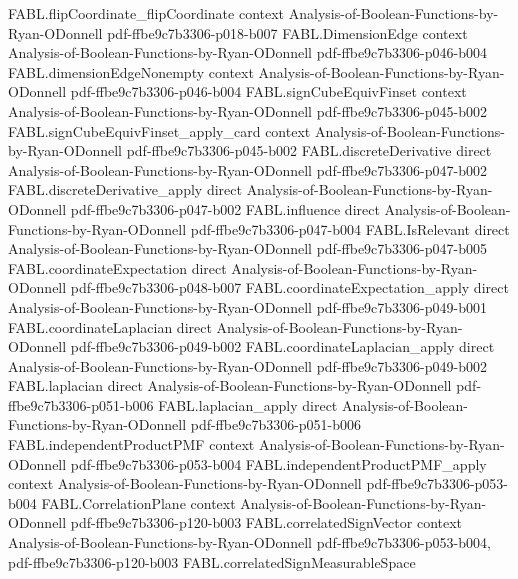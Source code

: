 \begin{theorem}
\proofstep
  {FABL.flipCoordinate_flipCoordinate}
  {context}
  {Analysis-of-Boolean-Functions-by-Ryan-ODonnell}
  {pdf-ffbe9c7b3306-p018-b007}
\proofstep
  {FABL.DimensionEdge}
  {context}
  {Analysis-of-Boolean-Functions-by-Ryan-ODonnell}
  {pdf-ffbe9c7b3306-p046-b004}
\proofstep
  {FABL.dimensionEdgeNonempty}
  {context}
  {Analysis-of-Boolean-Functions-by-Ryan-ODonnell}
  {pdf-ffbe9c7b3306-p046-b004}
\proofstep
  {FABL.signCubeEquivFinset}
  {context}
  {Analysis-of-Boolean-Functions-by-Ryan-ODonnell}
  {pdf-ffbe9c7b3306-p045-b002}
\proofstep
  {FABL.signCubeEquivFinset_apply_card}
  {context}
  {Analysis-of-Boolean-Functions-by-Ryan-ODonnell}
  {pdf-ffbe9c7b3306-p045-b002}
\proofstep
  {FABL.discreteDerivative}
  {direct}
  {Analysis-of-Boolean-Functions-by-Ryan-ODonnell}
  {pdf-ffbe9c7b3306-p047-b002}
\proofstep
  {FABL.discreteDerivative_apply}
  {direct}
  {Analysis-of-Boolean-Functions-by-Ryan-ODonnell}
  {pdf-ffbe9c7b3306-p047-b002}
\proofstep
  {FABL.influence}
  {direct}
  {Analysis-of-Boolean-Functions-by-Ryan-ODonnell}
  {pdf-ffbe9c7b3306-p047-b004}
\proofstep
  {FABL.IsRelevant}
  {direct}
  {Analysis-of-Boolean-Functions-by-Ryan-ODonnell}
  {pdf-ffbe9c7b3306-p047-b005}
\proofstep
  {FABL.coordinateExpectation}
  {direct}
  {Analysis-of-Boolean-Functions-by-Ryan-ODonnell}
  {pdf-ffbe9c7b3306-p048-b007}
\proofstep
  {FABL.coordinateExpectation_apply}
  {direct}
  {Analysis-of-Boolean-Functions-by-Ryan-ODonnell}
  {pdf-ffbe9c7b3306-p049-b001}
\proofstep
  {FABL.coordinateLaplacian}
  {direct}
  {Analysis-of-Boolean-Functions-by-Ryan-ODonnell}
  {pdf-ffbe9c7b3306-p049-b002}
\proofstep
  {FABL.coordinateLaplacian_apply}
  {direct}
  {Analysis-of-Boolean-Functions-by-Ryan-ODonnell}
  {pdf-ffbe9c7b3306-p049-b002}
\proofstep
  {FABL.laplacian}
  {direct}
  {Analysis-of-Boolean-Functions-by-Ryan-ODonnell}
  {pdf-ffbe9c7b3306-p051-b006}
\proofstep
  {FABL.laplacian_apply}
  {direct}
  {Analysis-of-Boolean-Functions-by-Ryan-ODonnell}
  {pdf-ffbe9c7b3306-p051-b006}
\proofstep
  {FABL.independentProductPMF}
  {context}
  {Analysis-of-Boolean-Functions-by-Ryan-ODonnell}
  {pdf-ffbe9c7b3306-p053-b004}
\proofstep
  {FABL.independentProductPMF_apply}
  {context}
  {Analysis-of-Boolean-Functions-by-Ryan-ODonnell}
  {pdf-ffbe9c7b3306-p053-b004}
\proofstep
  {FABL.CorrelationPlane}
  {context}
  {Analysis-of-Boolean-Functions-by-Ryan-ODonnell}
  {pdf-ffbe9c7b3306-p120-b003}
\proofstep
  {FABL.correlatedSignVector}
  {context}
  {Analysis-of-Boolean-Functions-by-Ryan-ODonnell}
  {pdf-ffbe9c7b3306-p053-b004,
    pdf-ffbe9c7b3306-p120-b003}
\proofstep
  {FABL.correlatedSignMeasurableSpace}

\end{theorem}
